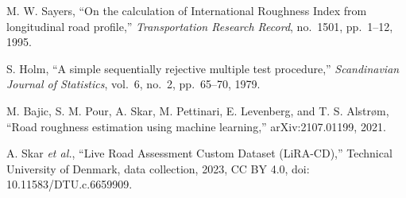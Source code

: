 M. W. Sayers, ``On the calculation of International Roughness Index from longitudinal road profile,'' \emph{Transportation Research Record}, no.~1501, pp.~1--12, 1995.

S. Holm, ``A simple sequentially rejective multiple test procedure,'' \emph{Scandinavian Journal of Statistics}, vol.~6, no.~2, pp.~65--70, 1979.

M. Bajic, S. M. Pour, A. Skar, M. Pettinari, E. Levenberg, and T. S. Alstr{\o}m, ``Road roughness estimation using machine learning,'' arXiv:2107.01199, 2021.

A. Skar \emph{et al.}, ``Live Road Assessment Custom Dataset (LiRA-CD),'' Technical University of Denmark, data collection, 2023, CC BY 4.0, doi: 10.11583/DTU.c.6659909.

